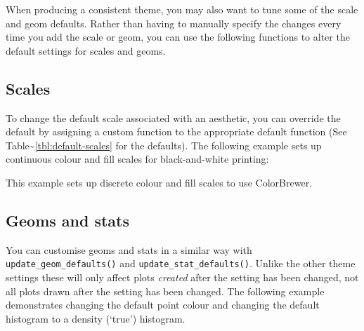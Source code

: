 When producing a consistent theme, you may also want to tune some of the
scale and geom defaults. Rather than having to manually specify the
changes every time you add the scale or geom, you can use the following
functions to alter the default settings for scales and geoms.

\subsection{Scales}\label{sub:customise-scales}

To change the default scale associated with an aesthetic, you can
override the default by assigning a custom function to the appropriate
default function (See Table\textasciitilde{}\ref{tbl:default-scales} for
the defaults). The following example sets up continuous colour and fill
scales for black-and-white printing: 

This example sets up discrete colour and fill scales to use ColorBrewer.

\subsection{Geoms and stats}\label{sub:geoms-and-stats}

You can customise geoms and stats in a similar way with
\texttt{update\_geom\_defaults()} and \texttt{update\_stat\_defaults()}.
Unlike the other theme settings these will only affect plots
\emph{created} after the setting has been changed, not all plots drawn
after the setting has been changed. The following example demonstrates
changing the default point colour and changing the default histogram to
a density (`true') histogram. 
 

\begin{Shaded}
\begin{Highlighting}[]
\NormalTok{(}\NormalTok{, }\NormalTok{(} \NormalTok{))}
 
\NormalTok{(}\NormalTok{, }\NormalTok{(} 
  \NormalTok{, } \NormalTok{)}
\end{Highlighting}
\end{Shaded}

